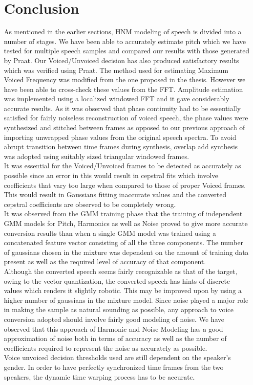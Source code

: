 \documentclass[BTech]{nitkdiss}
\begin{document}
{{\chapter{\vspace{10px} Conclusion}
As mentioned in the earlier sections, HNM modeling of speech is divided into a number of stages. We have been able to accurately estimate pitch which we have tested for multiple speech samples and compared our results with those generated by Praat. Our Voiced/Unvoiced decision has also produced satisfactory results which was verified using Praat. The method used for estimating Maximum Voiced Frequency was modified from the one proposed in the thesis. However we have been able to cross-check these values from the FFT. Amplitude estimation was implemented using a localized windowed FFT and it gave considerably accurate results. As it was observed that phase continuity had to be essentially satisfied for fairly noiseless reconstruction of voiced speech, the phase values were synthesized and stitched between frames as opposed to our previous approach of importing unwrapped phase values from the original speech spectra. To avoid abrupt transition between time frames during synthesis, overlap add synthesis was adopted using suitably sized triangular windowed frames.\bigskip\\
It was essential for the Voiced/Unvoiced frames to be detected as accurately as possible since an error in this would result in cepstral fits which involve coefficients that vary too large when compared to those of proper Voiced frames. This would result in Gaussians fitting inaccurate values and the converted cepstral coefficients are observed to be completely wrong.\bigskip\\
It was observed from the GMM training phase that the training of independent GMM models for Pitch, Harmonics as well as Noise proved to give more accurate conversion results than when a single GMM model was trained using a concatenated feature vector consisting of all the three components. The number of gaussians chosen in the mixture was dependent on the amount of training data present as well as the required level of accuracy of that component.\bigskip\\
Although the converted speech seems fairly recognizable as that of the target, owing to the vector quantization, the converted speech has hints of discrete values which renders it slightly robotic. This may be improved upon by using a higher number of gaussians in the mixture model. Since noise played a major role in making the sample as natural sounding as possible, any approach to voice conversion adopted should involve fairly good modeling of noise. We have observed that this approach of Harmonic and Noise Modeling has a good approximation of noise both in terms of accuracy as well as the number of coefficients required to represent the noise as accurately as possible.\bigskip\\
Voice unvoiced decision thresholds used are still dependent on the speaker's gender. In order to have perfectly synchronized time frames from the two speakers, the dynamic time warping process has to be accurate.

}}
\end{document}
